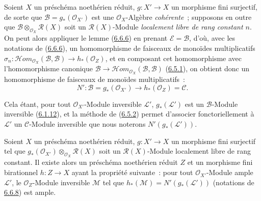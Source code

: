 \begin{env}[6.6.8]
\label{II.6.6.8-fr}
Soient $X$ un préschéma noethérien réduit, $g:X'\to X$ un morphisme fini
surjectif, de sorte que $\mathcal{B}=g_*(\mathcal{O}_{X'})$ est une
$\mathcal{O}_X$-Algèbre \emph{cohérente}~; supposons en outre que
$\mathcal{B}\otimes_{\mathcal{O}_X}\mathcal{R}(X)$ soit un
$\mathcal{R}(X)$-Module \emph{localement libre de rang constant $n$}. On peut
alors appliquer le lemme (\hyperref[II.6.6.6-fr]{6.6.6}) en prenant
$\mathcal{E}=\mathcal{B}$, d'où, avec les notations de
(\hyperref[II.6.6.6-fr]{6.6.6}), un homomorphisme de faisceaux de monoïdes
multiplicatifs
$\sigma_n:\mathcal{H}om_{\mathcal{O}_X}(\mathcal{B},\mathcal{B})
\to h_*(\mathcal{O}_Z)$, et en composant cet homomorphisme avec
l'homomorphisme canonique
$\mathcal{B}\to
\mathcal{H}om_{\mathcal{O}_X}(\mathcal{B},\mathcal{B})$
(\hyperref[II.6.5.1-fr]{6.5.1}), on obtient donc un homomorphisme de
faisceaux de monoïdes multiplicatifs~:
\[
\label{II.6.6.8.1-fr}
N':\mathcal{B}=g_*(\mathcal{O}_{X'})\longrightarrow
h_*(\mathcal{O}_Z)=\mathcal{C}.
\tag{6.6.8.1}
\]

Cela étant, pour tout $\mathcal{O}_{X'}$-Module inversible $\mathcal{L}'$,
$g_*(\mathcal{L}')$ est un $\mathcal{B}$-Module inversible
(\hyperref[II.6.1.12-fr]{6.1.12}), et la méthode de
(\hyperref[II.6.5.2-fr]{6.5.2}) permet d'associer fonctoriellement à
$\mathcal{L}'$ un $\mathcal{C}$-Module inversible que nous noterons
$N'(g_*(\mathcal{L}'))$.
\end{env}

\begin{lemma}[6.6.9]
\label{II.6.6.9-fr}
Soient $X$ un préschéma noethérien réduit, $g:X'\to X$ un morphisme fini
surjectif tel que
$g_*(\mathcal{O}_{X'})\otimes_{\mathcal{O}_X}\mathcal{R}(X)$ soit un
$\mathcal{R}(X)$-Module localement libre de rang constant. Il existe alors
un préschéma noethérien réduit $Z$ et un morphisme fini birationnel
$h:Z\to X$ ayant la propriété suivante~: pour tout
$\mathcal{O}_{X'}$-Module ample $\mathcal{L}'$, le $\mathcal{O}_Z$-Module
inversible $\mathcal{M}$ tel que
$h_*(\mathcal{M})=N'(g_*(\mathcal{L}'))$ (notations de
\hyperref[II.6.6.8-fr]{6.6.8}) est ample.
\end{lemma}

